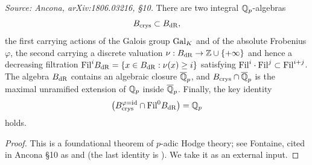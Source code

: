 \begin{theorem}
  \label{thm:bcrys-bdr}
  \textit{Source: Ancona, arXiv:1806.03216, \S10.}
  There are two integral \(\mathbb{Q}_p\)-algebras
  \[B_{\mathrm{crys}} \subset B_{\mathrm{dR}},\]
  the first carrying actions of the Galois group \(\mathrm{Gal}_K\) and of the absolute
  Frobenius \(\varphi\), the second carrying a discrete valuation
  \(\nu : B_{\mathrm{dR}} \to \mathbb{Z} \cup \{+\infty\}\) and hence a decreasing filtration
  \(\mathrm{Fil}^i B_{\mathrm{dR}} = \{x \in B_{\mathrm{dR}} : \nu(x) \geq i\}\) satisfying
  \(\mathrm{Fil}^i \cdot \mathrm{Fil}^j \subset \mathrm{Fil}^{i+j}\). The algebra \(B_{\mathrm{dR}}\) contains an
  algebraic closure \(\overline{\mathbb{Q}}_p\), and \(B_{\mathrm{crys}} \cap \overline{\mathbb{Q}}_p\) is
  the maximal unramified extension of \(\mathbb{Q}_p\) inside \(\overline{\mathbb{Q}}_p\).
  Finally, the key identity
  \[\bigl(B_{\mathrm{crys}}^{\varphi=\mathrm{id}} \cap \mathrm{Fil}^0 B_{\mathrm{dR}}\bigr) = \mathbb{Q}_p\]
  holds.
\end{theorem}

\begin{proof}
  This is a foundational theorem of \(p\)-adic Hodge theory; see Fontaine, cited
  in Ancona \S10 as \cite{Fonfon} and \cite{Fontp} (the last identity is
  \cite[Theorem~5.3.7]{Fontp}). We take it as an external input.
\end{proof}

